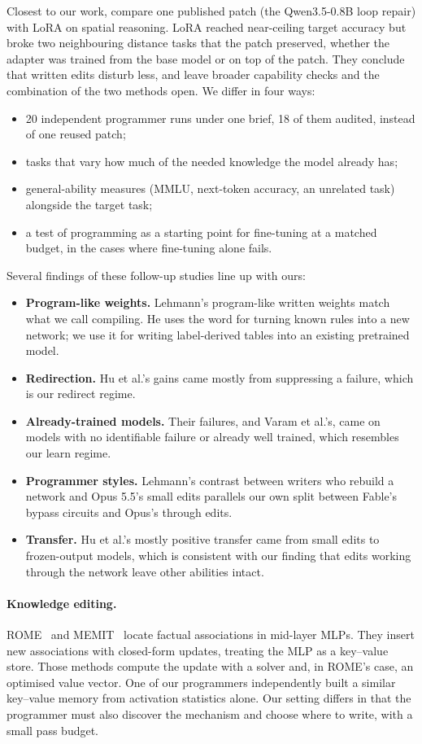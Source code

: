 Closest to our work, \citet{yang2026writing} compare one published patch (the Qwen3.5-0.8B loop repair) with LoRA on spatial reasoning. LoRA reached near-ceiling target accuracy but broke two neighbouring distance tasks that the patch preserved, whether the adapter was trained from the base model or on top of the patch. They conclude that written edits disturb less, and leave broader capability checks and the combination of the two methods open. We differ in four ways:
\begin{itemize}
  \item 20 independent programmer runs under one brief, 18 of them audited, instead of one reused patch;
  \item tasks that vary how much of the needed knowledge the model already has;
  \item general-ability measures (MMLU, next-token accuracy, an unrelated task) alongside the target task;
  \item a test of programming as a starting point for fine-tuning at a matched budget, in the cases where fine-tuning alone fails.
\end{itemize}

Several findings of these follow-up studies line up with ours:
\begin{itemize}
  \item \textbf{Program-like weights.} Lehmann's program-like written weights match what we call compiling. He uses the word for turning known rules into a new network; we use it for writing label-derived tables into an existing pretrained model.
  \item \textbf{Redirection.} Hu et al.'s gains came mostly from suppressing a failure, which is our redirect regime.
  \item \textbf{Already-trained models.} Their failures, and Varam et al.'s, came on models with no identifiable failure or already well trained, which resembles our learn regime.
  \item \textbf{Programmer styles.} Lehmann's contrast between writers who rebuild a network and Opus 5.5's small edits parallels our own split between Fable's bypass circuits and Opus's through edits.
  \item \textbf{Transfer.} Hu et al.'s mostly positive transfer came from small edits to frozen-output models, which is consistent with our finding that edits working through the network leave other abilities intact.
\end{itemize}

\paragraph{Knowledge editing.} ROME~\citep{meng2022rome} and MEMIT~\citep{meng2023memit} locate factual associations in mid-layer MLPs. They insert new associations with closed-form updates, treating the MLP as a key--value store. Those methods compute the update with a solver and, in ROME's case, an optimised value vector. One of our programmers independently built a similar key--value memory from activation statistics alone. Our setting differs in that the programmer must also discover the mechanism and choose where to write, with a small pass budget.

